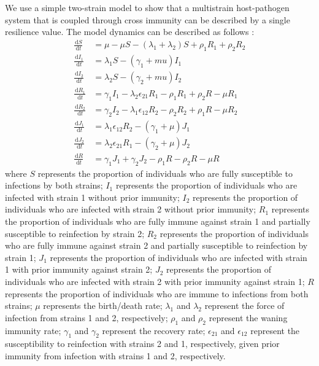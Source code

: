 \documentclass[12pt]{article}
\newcommand{\dd}[1]{\ensuremath{\, \mathrm{d}#1}}
\begin{document}
We use a simple two-strain model to show that a multistrain host-pathogen system that is coupled through cross immunity can be described by a single resilience value.
The model dynamics can be described as follows \citep{bhattacharyya2015cross}: 
\begin{align}
\frac{\dd S}{\dd t} &= \mu - \mu S - (\lambda_1 + \lambda_2) S + \rho_1 R_1 + \rho_2 R_2 \\
\frac{\dd I_1}{\dd t} &= \lambda_1 S - (\gamma_1 + mu) I_1 \\
\frac{\dd I_2}{\dd t} &= \lambda_2 S - (\gamma_2 + mu) I_2 \\
\frac{\dd R_1}{\dd t} &= \gamma_1 I_1 - \lambda_2 \epsilon_{21} R_1 - \rho_1 R_1 + \rho_2 R - \mu R_1\\
\frac{\dd R_2}{\dd t} &= \gamma_2 I_2 - \lambda_1 \epsilon_{12} R_2 - \rho_2 R_2 + \rho_1 R - \mu R_2\\
\frac{\dd J_1}{\dd t} &= \lambda_1 \epsilon_{12} R_2 - (\gamma_1 + \mu) J_1\\
\frac{\dd J_2}{\dd t} &= \lambda_2 \epsilon_{21} R_1 - (\gamma_2 + \mu) J_2\\
\frac{\dd R}{\dd t} &= \gamma_1 J_1 + \gamma_2 J_2 - \rho_1 R - \rho_2 R - \mu R
\end{align}
where $S$ represents the proportion of individuals who are fully susceptible to infections by both strains;
$I_1$ represents the proportion of individuals who are infected with strain 1 without prior immunity;
$I_2$ represents the proportion of individuals who are infected with strain 2 without prior immunity;
$R_1$ represents the proportion of individuals who are fully immune against strain 1 and partially susceptible to reinfection by strain 2;
$R_2$ represents the proportion of individuals who are fully immune against strain 2 and partially susceptible to reinfection by strain 1;
$J_1$ represents the proportion of individuals who are infected with strain 1 with prior immunity against strain 2;
$J_2$ represents the proportion of individuals who are infected with strain 2 with prior immunity against strain 1;
$R$ represents the proportion of individuals who are immune to infections from both strains;
$\mu$ represents the birth/death rate;
$\lambda_1$ and $\lambda_2$ represent the force of infection from strains 1 and 2, respectively;
$\rho_1$ and $\rho_2$ represent the waning immunity rate;
$\gamma_1$ and $\gamma_2$ represent the recovery rate;
$\epsilon_{21}$ and $\epsilon_{12}$ represent the susceptibility to reinfection with strains 2 and 1, respectively, given prior immunity from infection with strains 1 and 2, respectively. 
\end{document}
